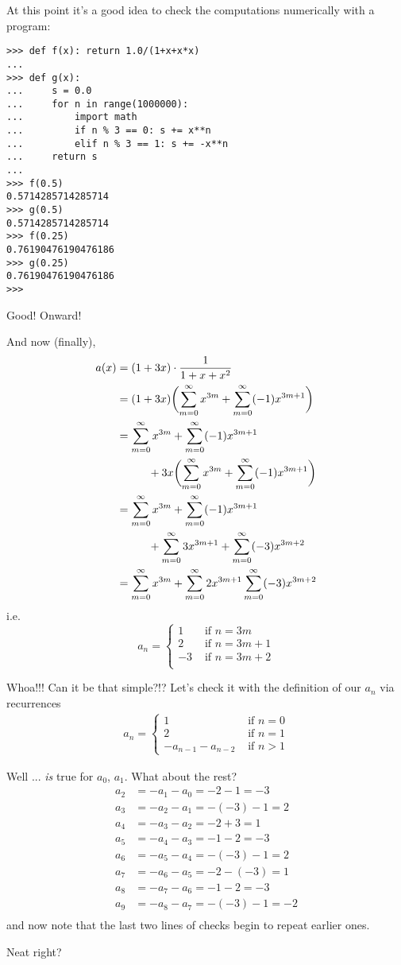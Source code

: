 At this point it's a good idea to check the computations numerically with 
a program:
\begin{Verbatim}[frame=single,fontsize=\footnotesize]
>>> def f(x): return 1.0/(1+x+x*x)
...
>>> def g(x):
...     s = 0.0
...     for n in range(1000000):
...         import math
...         if n % 3 == 0: s += x**n
...         elif n % 3 == 1: s += -x**n
...     return s
...
>>> f(0.5)
0.5714285714285714
>>> g(0.5)
0.5714285714285714
>>> f(0.25)
0.76190476190476186
>>> g(0.25)
0.76190476190476186
>>>
\end{Verbatim}
Good! Onward!

And now (finally), 
\begin{align*}
a(x) 
&= (1 + 3x) \cdot \frac{1}{1 + x + x^2} \\
&= 
(1 + 3x) 
\biggl( 
\sum_{m=0}^\infty x^{3m} +
\sum_{m=0}^\infty (-1)x^{3m+1}\biggr) \\
&=  
\sum_{m=0}^\infty x^{3m} +
\sum_{m=0}^\infty (-1)x^{3m+1}  \\
&\hskip 1cm + 3x
\biggl( 
\sum_{m=0}^\infty x^{3m} +
\sum_{m=0}^\infty (-1)x^{3m+1}\biggr) \\
&=   
\sum_{m=0}^\infty x^{3m} +
\sum_{m=0}^\infty (-1)x^{3m+1}  \\
&\hskip 1cm +
\sum_{m=0}^\infty 3x^{3m+1} +
\sum_{m=0}^\infty (-3)x^{3m+2} \\
&=   
\sum_{m=0}^\infty x^{3m} +
\sum_{m=0}^\infty 2x^{3m+1}
\sum_{m=0}^\infty (-3)x^{3m+2} \\
\end{align*}
i.e.
\[
a_n = 
\begin{cases}
1  &\text{ if } n = 3m \\
2  &\text{ if } n = 3m + 1\\
-3 &\text{ if } n = 3m + 2\\
\end{cases}
\]

Whoa!!! Can it be that simple?!?
Let's check it with the definition of our $a_n$ via recurrences
\begin{align*}
a_n = 
\begin{cases}
1 & \text{ if } n = 0 \\
2 & \text{ if } n = 1 \\
-a_{n-1} - a_{n-2} &\text{ if } n > 1 
\end{cases}
\end{align*}

Well ... \textit{is} true for $a_0$, $a_1$.
What about the rest?
\begin{align*}
a_2 &= -a_1 - a_0 = -2-1 = -3 \\
a_3 &= -a_2 -a_1 = -(-3) - 1 = 2 \\
a_4 &= -a_3-a_2 = -2+3 = 1 \\
a_5 &= -a_4-a_3 = -1-2 = -3 \\
a_6 &= -a_5-a_4 = -(-3)-1 = 2 \\
a_7 &= -a_6-a_5 = -2-(-3) = 1 \\
a_8 &= -a_7-a_6 = -1-2 = -3 \\
a_9 &= -a_8-a_7 = -(-3)-1 = -2 \\
\end{align*}
and now note that the last two lines of checks begin to repeat earlier ones.

Neat right?
\vfill\eject
